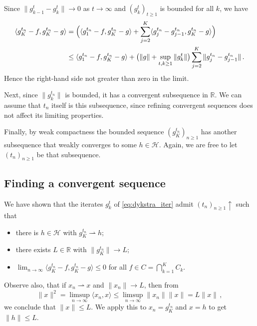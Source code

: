\documentclass[a4paper]{article}
\newcommand{\Hcal}{\mathcal{H}}
\newcommand{\real}{\mathbb{R}}
\begin{document}
Since $\|g^t_{k-1} - g^t_k \| \to 0$ as $t\to \infty$ and $(g^t_k)_{t\geq1}$ is
bounded for all $k$, we have
\begin{align*}
  \langle g^{t_n}_K - f, g^{t_n}_K - g \rangle
    &= \Bigl(
      \langle g^{t_n}_1 - f, g^{t_n}_K - g \rangle
        + \sum_{j=2}^K \langle g^{t_n}_j - g^{t_n}_{j-1}, g^{t_n}_K - g \rangle
      \Bigr)
      \\
    &\leq \langle g^{t_n}_1 - f, g^{t_n}_K - g \rangle
      + \bigl(
        \|g\| + \sup_{t,k\geq 1} \|g^t_k\|
      \bigr) \sum_{j=2}^K \|g^{t_n}_j - g^{t_n}_{j-1}\|
      \,.
\end{align*}
Hence the right-hand side not greater than zero in the limit.

Next, since $\|g^{t_n}_k\|$ is bounded, it has a convergent subsequence in $\real$.
We can assume that $t_n$ itself is this subsequence, since refining convergent
sequences does not affect its limiting properties.

Finally, by weak compactness the bounded sequence $(g^{t_n}_K)_{n\geq 1}$ has another
subsequence that weakly converges to some $h \in \Hcal$. Again, we are free to let
$(t_n)_{n\geq 1}$ be that subsequence.



\subsection*{Finding a convergent sequence} %
\label{sub:finding_a_convergent_sequence}

We have shown that the iterates $g^t_k$ of \eqref{eq:dykstra_iter} admit
$(t_n)_{n \geq 1} \uparrow$ such that
\begin{itemize}
  \item there is $h\in \Hcal$ with $g^{t_n}_K \rightharpoonup h$;
  \item there exists $L \in \real$ with $\|g^{t_n}_K\| \to L$;
  \item $\lim_{n\to \infty} \langle g^{t_n}_K - f, g^{t_n}_K - g \rangle \leq 0$
  for all $f\in C = \bigcap_{k=1}^K C_k$.
\end{itemize}
Observe also, that if $x_n \rightharpoonup x$ and $\|x_n\| \to L$, then from
\begin{equation*}
  \|x\|^2
    = \limsup_{n\to \infty} \langle x_n, x\rangle
    \leq \limsup_{n\to \infty} \|x_n\| \|x\|
    = L \|x\|
    \,,
\end{equation*}
we conclude that $\|x\| \leq L$. We apply this to $x_n = g^{t_n}_K$ and $x = h$ to
get $\|h\|\leq L$.
\end{document}
